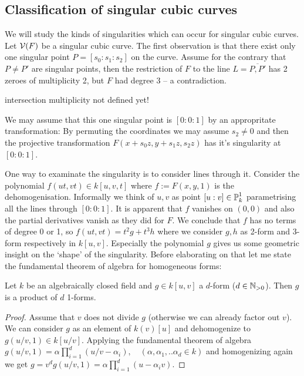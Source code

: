 \subsection{Classification of singular cubic curves}

We will study the kinds of singularities which can occur for singular cubic curves.
Let $\operatorname{\mathcal V}(F)$ be a singular cubic curve.
The first observation is that there exist only one singular point $P = [s_0:s_1:s_2]$ on the curve.
Assume for the contrary that $P \neq P'$ are singular points, then the restriction of $F$ to the line $L = \overline{P,P'}$ has 2 zeroes of multiplicity 2, but $F$ had degree 3 -- a contradiction.
\begin{todo} \item intersection multiplicity not defined yet! \end{todo}
We may assume that this one singular point is $[0:0:1]$ by an appropritate transformation:
By permuting the coordinates we may assume $s_2 \neq 0$ and then the projective transformation $F(x+s_0z,y+s_1z,s_2z)$ has it's singularity at $[0:0:1]$.

One way to examinate the singularity is to consider lines through it. Consider the polynomial $f(ut, vt) \in k[u,v,t]$
where $f := F(x,y,1)$ is the dehomogenisation.
Informally we think of $u,v$ as point $[u:v] \in \operatorname{\mathbb P}^1_k$ parametrising all the lines through $[0:0:1]$.
It is apparent that $f$ vanishes on $(0,0)$ and also the partial derivatives vanish as they did for $F$.
We conclude that $f$ has no terms of degree 0 or 1, so $f(ut,vt) = t^2g + t^3h$ where we consider $g,h$ as 2-form and 3-form respectively in $k[u,v]$.
Especially the polynomial $g$ gives us some geometric insight on the `shape' of the singularity.
Before elaborating on that let me state the fundamental theorem of algebra for homogeneous forms:

\begin{lemma} \label{lemmaFundamentalTheorem}
Let $k$ be an algebraically closed field and $g \in k[u,v]$ a $d$-form ($d \in \operatorname{\mathbb N_{>0}}$).
Then $g$ is a product of $d$ 1-forms.
\end{lemma}
\begin{proof}
Assume that $v$ does not divide $g$ (otherwise we can already factor out $v$).
We can consider $g$ as an element of $k(v)[u]$ and dehomogenize to $g(u/v,1) \in k[u/v]$.
Applying the fundamental theorem of algebra $g(u/v,1) = \alpha\prod_{i=1}^d(u/v - \alpha_i), \quad (\alpha,\alpha_1,..\alpha_d \in k)$ and homogenizing again we get
$g = v^d g(u/v,1) = \alpha\prod_{i=1}^d(u - \alpha_iv)$.
\end{proof}


